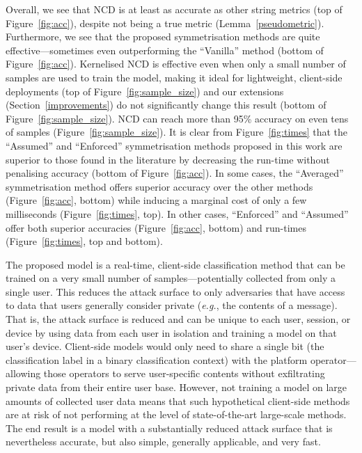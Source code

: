 \documentclass[preprint,12pt]{article}
\begin{document}
Overall, we see that NCD is at least as accurate as other string metrics (top of Figure~\ref{fig:acc}), despite not being a true metric (Lemma~\ref{pseudometric}). 
Furthermore, we see that the proposed symmetrisation methods are quite effective---sometimes even outperforming the ``Vanilla'' method (bottom of Figure~\ref{fig:acc}). 
Kernelised NCD is effective even when only a small number of samples are used to train the model, making it ideal for lightweight, client-side deployments (top of Figure~\ref{fig:sample_size}) and our extensions (Section~\ref{improvements}) do not significantly change this result (bottom of Figure~\ref{fig:sample_size}).
NCD can reach more than 95\% accuracy on even tens of samples (Figure~\ref{fig:sample_size}).
It is clear from Figure~\ref{fig:times} that the ``Assumed'' and ``Enforced'' symmetrisation methods proposed in this work are superior to those found in the literature by decreasing the run-time without penalising accuracy (bottom of Figure~\ref{fig:acc}).
In some cases, the ``Averaged'' symmetrisation method offers superior accuracy over the other methods (Figure~\ref{fig:acc}, bottom) while inducing a marginal cost of only a few milliseconds (Figure~\ref{fig:times}, top).
In other cases, ``Enforced'' and ``Assumed'' offer both superior accuracies (Figure~\ref{fig:acc}, bottom) and run-times (Figure~\ref{fig:times}, top and bottom).

The proposed model is a real-time, client-side classification method that can be trained on a very small number of samples---potentially collected from only a single user.
This reduces the attack surface to only adversaries that have access to data that users generally consider private (\textit{e.g.}, the contents of a message). 
That is, the attack surface is reduced and can be unique to each user, session, or device by using data from each user in isolation and training a model on that user's device. Client-side models would only need to share a single bit (the classification label in a binary classification context) with the platform operator---allowing those operators to serve user-specific contents without exfiltrating private data from their entire user base. 
However, not training a model on large amounts of collected user data means that such hypothetical client-side methods are at risk of not performing at the level of state-of-the-art large-scale methods.
The end result is a model with a substantially reduced attack surface that is nevertheless accurate, but also simple, generally applicable, and very fast.



 

\end{document}
